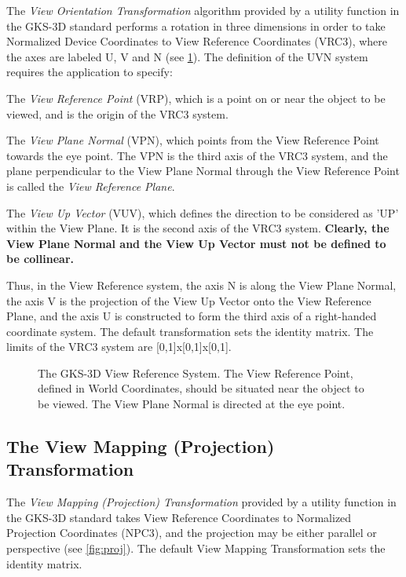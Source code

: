 The {\it View Orientation Transformation} algorithm provided by a
utility function in the GKS-3D standard performs a rotation in three
dimensions in order to take Normalized Device Coordinates to View
Reference Coordinates (VRC3), where the axes are labeled U, V and N
(see \ref{fig:vrc}).
The definition of the UVN system requires the application to specify:
 \begin{OL}
\item The {\it View Reference Point} (VRP), which is a point on or
near the object to be viewed, and is the origin of the VRC3 system.
\item The {\it View Plane Normal} (VPN), which points from the
View Reference Point towards the eye point. The VPN is the third axis
of the VRC3 system, and the plane perpendicular to the View Plane Normal
through the View Reference Point is called the {\it View Reference Plane}.
\item The {\it View Up Vector} (VUV), which defines the direction
to be considered as 'UP' within the View Plane.
It is the second axis of the VRC3 system.
{\bf Clearly, the View Plane Normal and the View Up Vector must not
be defined to be collinear.}
 \end{OL}
Thus, in the View Reference system, the axis N is along the
View Plane Normal, the axis V is the projection of the View Up Vector
onto the View Reference Plane, and the axis U is constructed to form the
third axis of a right-handed coordinate system.
The default transformation sets the identity matrix.
The limits of the VRC3 system are [0,1]x[0,1]x[0,1].
\begin{figure}[h]
\caption[The GKS-3D View Reference System]%
        {The GKS-3D View Reference System.
The View Reference Point, defined in World Coordinates,
should be situated near the object to be viewed.
The View Plane Normal is directed at the eye point.
}
\label{fig:vrc}
\end{figure}
\subsection{The View Mapping (Projection) Transformation}
 
The {\it View Mapping (Projection) Transformation} provided by a
utility function in the GKS-3D standard takes View Reference Coordinates
to Normalized Projection Coordinates (NPC3), and the projection may be
either parallel or perspective (see \ref{fig:proj}).
The default View Mapping Transformation sets the identity matrix.
 
